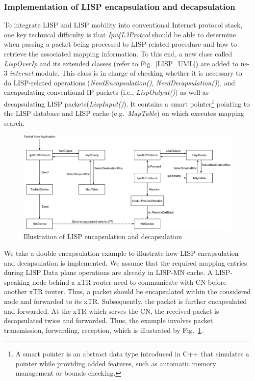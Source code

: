 \subsubsection{Implementation of LISP encapsulation and decapsulation}
To integrate LISP and LISP mobility into conventional Internet protocol stack, one key technical difficulty is that \emph{Ipv4L3Protcol} should be able to determine when passing a packet being processed to LISP-related procedure and how to retrieve the associated mapping information. To this end, a new class called \emph{LispOverIp} and its extended classes (refer to Fig.~\ref{LISP_UML}) are added to ns-3 \emph{internet} module. This class is in charge of checking whether it is necessary to do LISP-related operations (\emph{NeedEncapsulation()}, \emph{NeedDecapsulation()}), and encapsulating conventional IP packets (i.e., \emph{LispOutput()}) as well as decapsulating LISP packets(\emph{LispInput()}). It contains a smart pointer\footnote{A smart pointer is an abstract data type introduced in C++ that simulates a pointer while providing added features, such as automatic memory management or bounds checking.} pointing to the LISP database and LISP cache (e.g.~\emph{MapTable}) on which executes mapping search.
\begin{figure}[!t]
	\centering
	\includegraphics[width=\textwidth]{Pics/ns3_lisp_data_plane.eps}
	\caption{Illustration of LISP encapsulation and decapsulation}
	\label{fig:ns3-lisp-data-plane}
\end{figure}

We take a double encapsulation example to illustrate how LISP encapsulation and decapsulation is implemented. We assume that the required mapping entries during LISP Data plane operations are already in LISP-MN cache. A LISP-speaking node behind a xTR router need to communicate with CN before another xTR router. Thus, a packet should be encapsulated within the considered node and forwarded to its xTR. Subsequently, the packet is further encapsulated and forwarded. At the xTR which serves the CN, the received packet is decapsulated twice and forwarded. Thus, the example involves packet transmission, forwarding, reception, which is illustrated by Fig.~\ref{fig:ns3-lisp-data-plane}. 


